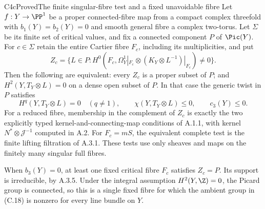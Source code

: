 \begin{statement}{C4c}{Proved}{The finite singular-fibre test and a fixed unavoidable fibre}
Let $f:Y\to\PP^1$ be a proper connected-fibre map from a compact complex threefold with $b_1(Y)=b_2(Y)=0$ and smooth general fibre a complex two-torus. Let $\Sigma$ be its finite set of critical values, and fix a connected component $P$ of $\Pic(Y)$. For $c\in\Sigma$ retain the entire Cartier fibre $F_c$, including its multiplicities, and put
\[
 Z_c=\{L\in P:H^0(F_c,\Omega_Y^1|_{F_c}\otimes
                  (K_Y\otimes L^{-1})|_{F_c})\ne0\}.
                                                               \tag{C.18}
\]
Then the following are equivalent: every $Z_c$ is a proper subset of $P$; and $H^2(Y,T_Y\otimes L)=0$ on a dense open subset of $P$. In that case the generic twist in $P$ satisfies
\[
 H^q(Y,T_Y\otimes L)=0\quad(q\ne1),\qquad
 \chi(Y,T_Y\otimes L)\le0,\qquad c_3(Y)\le0.          \tag{C.19}
\]
For a reduced fibre, membership in the complement of $Z_c$ is exactly the two explicitly typed kernel-and-connecting-map conditions of A.1.1, with kernel $N^*\otimes\mathcal J^{-1}$ computed in A.2. For $F_c=mS$, the equivalent complete test is the finite lifting filtration of A.3.1. These tests use only sheaves and maps on the finitely many singular full fibres.

When $b_3(Y)=0$, at least one fixed critical fibre $F_c$ satisfies $Z_c=P$. Its support is irreducible, by A.3.5. Under the integral assumption $H^2(Y,\Z)=0$, the Picard group is connected, so this is a single fixed fibre for which the ambient group in (C.18) is nonzero for every line bundle on $Y$.
\end{statement}
